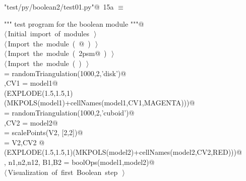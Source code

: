 \documentclass[11pt,oneside]{article}	%
\begin{document}
\begin{flushleft} \small
\begin{minipage}{\linewidth} \label{scrap26}
\protect{}\verb@"test/py/boolean2/test01.py"@\nobreak\ {\footnotesize 15a }$\equiv$
\vspace{-1ex}
\begin{list}{}{} \item
\mbox{}\verb@""" test program for the boolean module """@\\
\mbox{}\verb@@\hbox{$\langle\,$Initial import of modules\nobreak\ {\footnotesize {}}$\,\rangle$}\verb@@\\
\mbox{}\verb@@\hbox{$\langle\,$Import the module\nobreak\ ({\footnotesize {}\label{scrap27}
 }\mbox{}@ ) {\footnotesize {}}$\,\rangle$}\verb@@\\
\mbox{}\verb@@\hbox{$\langle\,$Import the module\nobreak\ ({\footnotesize {}\label{scrap28}
 }\mbox{}\verb@lar2psm@ ) {\footnotesize {}}$\,\rangle$}\verb@@\\
\mbox{}\verb@@\hbox{$\langle\,$Import the module\nobreak\ ({\footnotesize {}\label{scrap29}
 }\mbox{}\verb@myfont@ ) {\footnotesize {}}$\,\rangle$}\verb@@\\
\mbox{} = randomTriangulation(1000,2,'disk')@\\
\mbox{},CV1 = model1@\\
\mbox{}\verb@VIEW(EXPLODE(1.5,1.5,1)(MKPOLS(model1)+cellNames(model1,CV1,MAGENTA)))@\\
\mbox{} = randomTriangulation(1000,2,'cuboid')@\\
\mbox{},CV2 = model2@\\
\mbox{} = scalePoints(V2, [2,2])@\\
\mbox{} = V2,CV2 @\\
\mbox{}\verb@VIEW(EXPLODE(1.5,1.5,1)(MKPOLS(model2)+cellNames(model2,CV2,RED)))@\\
\mbox{}\verb@V, n1,n2,n12, B1,B2 = boolOps(model1,model2)@\\
\mbox{}\verb@@\hbox{$\langle\,$Visualization of first Boolean step\nobreak\ {\footnotesize {}}$\,\rangle$}\verb@@\\
\mbox{}\verb@@{\NWsep}
\end{list}
\vspace{-2ex}
\end{minipage}\\[4ex]
\end{flushleft}
\end{document}
